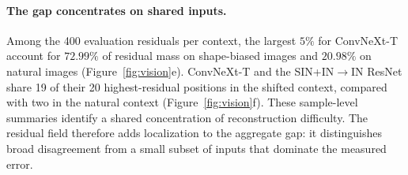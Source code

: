 \paragraph{The gap concentrates on shared inputs.}
Among the 400 evaluation residuals per context, the largest $5\%$ for ConvNeXt-T account for $72.99\%$ of residual mass on shape-biased images and $20.98\%$ on natural images (Figure~\ref{fig:vision}e). ConvNeXt-T and the SIN+IN$\to$IN ResNet share 19 of their 20 highest-residual positions in the shifted context, compared with two in the natural context (Figure~\ref{fig:vision}f). These sample-level summaries identify a shared concentration of reconstruction difficulty. The residual field therefore adds localization to the aggregate gap: it distinguishes broad disagreement from a small subset of inputs that dominate the measured error.
